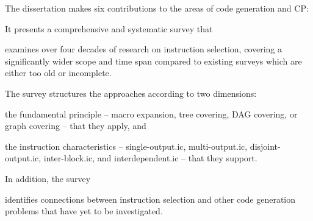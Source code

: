 The dissertation makes six contributions to the areas of \gls{code generation}
and \glsdesc{CP}:
%
\begin{contributions}
  \item {}
    It presents a comprehensive and systematic survey that
    \begin{contributions}
      \item {}
        examines over four decades of research on \gls{instruction selection},
        covering a significantly wider scope and time span compared to existing
        surveys \cite{Cattell:1977, GanapathiEtAl:1982:Survey, Lunell:1983,
          Leupers:2000:Survey, BoulytchevLomov:2001} which are either too old
        or incomplete.
    \end{contributions}
    The survey structures the approaches according to two dimensions:
    \begin{contributions}[resume]
      \item {}
        the fundamental \gls{principle} -- \gls{macro expansion}, \gls{tree
          covering}, \gls{DAG covering}, or \gls{graph covering} -- that they
        apply, and
    \end{contributions}
    \begin{contributions}[resume]
      \item {}
        the \glspl{instruction characteristic} -- \gls{single-output.ic},
        \gls{multi-output.ic}, \gls{disjoint-output.ic}, \gls{inter-block.ic},
        and \gls{interdependent.ic} -- that they support.
    \end{contributions}
    In addition, the survey
    \begin{contributions}[resume]
      \item {}
        identifies connections between \gls{instruction selection} and other
        \gls{code generation} problems that have yet to be investigated.
    \end{contributions}


\end{contributions}
